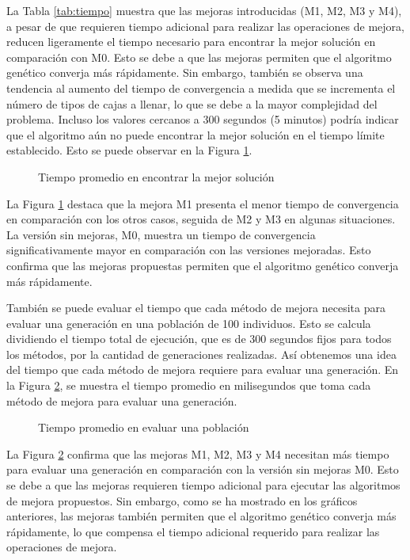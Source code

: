 \documentclass[openany]{article}
\begin{document}
La Tabla \ref{tab:tiempo} muestra que las mejoras introducidas (M1, M2, M3 y M4), a pesar de que requieren tiempo adicional para realizar las operaciones de mejora, reducen ligeramente el tiempo necesario para encontrar la mejor solución en comparación con M0. Esto se debe a que las mejoras permiten que el algoritmo genético converja más rápidamente. Sin embargo, también se observa una tendencia al aumento del tiempo de convergencia a medida que se incrementa el número de tipos de cajas a llenar, lo que se debe a la mayor complejidad del problema. Incluso los valores cercanos a 300 segundos (5 minutos) podría indicar que el algoritmo aún no puede encontrar la mejor solución en el tiempo límite establecido. Esto se puede observar en la Figura \ref{fig:tiempos}.

\begin{figure}[H]
    \centering
    
    \caption{Tiempo promedio en encontrar la mejor solución}
    \label{fig:tiempos}
\end{figure}

La Figura \ref{fig:tiempos} destaca que la mejora M1 presenta el menor tiempo de convergencia en comparación con los otros casos, seguida de M2 y M3 en algunas situaciones. La versión sin mejoras, M0, muestra un tiempo de convergencia significativamente mayor en comparación con las versiones mejoradas. Esto confirma que las mejoras propuestas permiten que el algoritmo genético converja más rápidamente.

También se puede evaluar el tiempo que cada método de mejora necesita para evaluar una generación en una población de 100 individuos. Esto se calcula dividiendo el tiempo total de ejecución, que es de 300 segundos fijos para todos los métodos, por la cantidad de generaciones realizadas. Así obtenemos una idea del tiempo que cada método de mejora requiere para evaluar una generación. En la Figura \ref{fig:tiempo_generacion}, se muestra el tiempo promedio en milisegundos que toma cada método de mejora para evaluar una generación.

\begin{figure}[H]
    \centering
    
    \caption{Tiempo promedio en evaluar una población}
    \label{fig:tiempo_generacion}
\end{figure}

La Figura \ref{fig:tiempo_generacion} confirma que las mejoras M1, M2, M3 y M4 necesitan más tiempo para evaluar una generación en comparación con la versión sin mejoras M0. Esto se debe a que las mejoras requieren tiempo adicional para ejecutar las algoritmos de mejora propuestos. Sin embargo, como se ha mostrado en los gráficos anteriores, las mejoras también permiten que el algoritmo genético converja más rápidamente, lo que compensa el tiempo adicional requerido para realizar las operaciones de mejora.
\end{document}
